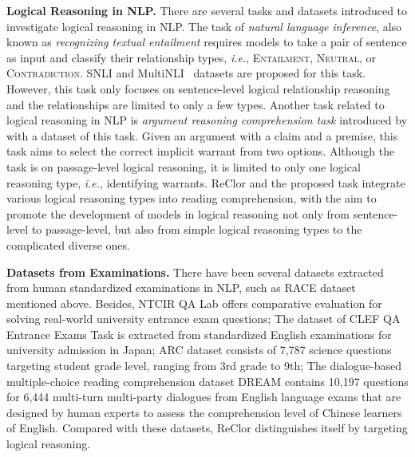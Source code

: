 \documentclass{article} \usepackage{iclr2020_conference,times}
\begin{document}
\textbf{Logical Reasoning in NLP. }
There are several tasks and datasets introduced to investigate logical reasoning in NLP. The task of {\it natural language inference}, also known as \textit{recognizing textual entailment} \citep{fyodorov2000natural, condoravdi2003entailment, bos2005recognising, dagan2005pascal, maccartney2009extended} requires models to take a pair of sentence as input and classify their relationship types, \textit{i.e.}, \textsc{Entailment}, \textsc{Neutral}, or \textsc{Contradiction}. SNLI \citep{bowman2015large} and MultiNLI~\citep{williams2018broad} datasets are proposed for this task. However, this task only focuses on sentence-level logical relationship reasoning and the relationships are limited to only a few types.  Another task related to logical reasoning in NLP is \textit{argument reasoning comprehension task} introduced by \citet{habernal2018argument} with a dataset of this task. Given an argument with a claim and a premise, this task aims to select the correct implicit warrant from two options. Although the task is on passage-level logical reasoning, it is limited to only one logical reasoning type, \textit{i.e.}, identifying warrants. ReClor and the proposed task integrate various logical reasoning types into reading comprehension, with the aim to promote the development of models in logical reasoning  not only from sentence-level to passage-level, but also from simple logical reasoning types to the complicated diverse ones.

\textbf{Datasets from Examinations. } 
There have been several datasets extracted from human standardized examinations in NLP, such as RACE dataset \citep{lai2017race} mentioned above. Besides, NTCIR QA Lab \citep{shibuki2014overview} offers comparative evaluation for solving real-world university entrance exam questions; The dataset of CLEF QA Entrance Exams Task \citep{rodrigo2015overview} is extracted from standardized English examinations for university admission in Japan; ARC dataset \citep{clark2018think} consists of 7,787 science questions targeting student grade level, ranging from 3rd grade to 9th; The dialogue-based multiple-choice reading comprehension dataset DREAM \citep{sun2019dream} contains 10,197 questions for 6,444 multi-turn multi-party dialogues from English language exams that are designed by human experts to assess the comprehension level of Chinese learners of English. Compared with these datasets, ReClor distinguishes itself by targeting logical reasoning.


\vspace{-2mm}
\end{document}
